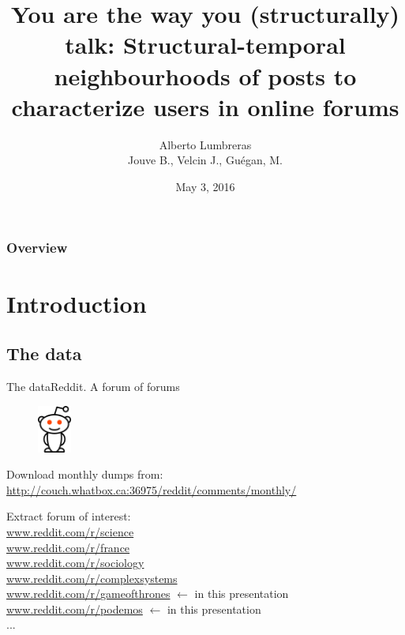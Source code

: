 \documentclass{beamer}
\begin{document}

	
\title{You are the way you (structurally) talk:  Structural-temporal neighbourhoods of posts to characterize users in online forums}
\author{Alberto Lumbreras \\Jouve B., Velcin J., Guégan, M.}
\date{May 3, 2016}
\maketitle

\begin{frame}\frametitle{Overview} 
\begin{NoHyper}
\tableofcontents
\end{NoHyper}
\end{frame}

\section{Introduction}
\subsection{The data}

\begin{frame}{The data}{Reddit. A forum of forums}
	\begin{figure}
		\centering
		\includegraphics[width=0.1\textwidth]{reddit-logo}	
	\end{figure}
	Download monthly dumps from:
	\href{http://couch.whatbox.ca:36975/reddit/comments/monthly/}{http://couch.whatbox.ca:36975/reddit/comments/monthly/}
	
	\vfill
	Extract forum of interest:\\
	\href{www.reddit.com/r/podemos}{www.reddit.com/r/{\color{red}science}}\\
	\href{www.reddit.com/r/podemos}{www.reddit.com/r/{\color{red}france}}\\
	\href{www.reddit.com/r/podemos}{www.reddit.com/r/{\color{red}sociology}}\\
	\href{www.reddit.com/r/podemos}{www.reddit.com/r/{\color{red}complexsystems}}\\
	\href{www.reddit.com/r/gameofthrones}{www.reddit.com/r/{\color{red}gameofthrones}} $\leftarrow$ in this presentation\\
	\href{www.reddit.com/r/podemos}{www.reddit.com/r/{\color{red}podemos}} $\leftarrow$ in this presentation\\
	...
\end{frame}
\end{document}
